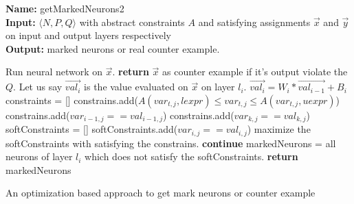 \begin{algorithm}[t]
  \textbf{Name: } getMarkedNeurons2 \\
  \textbf{Input: } $\langle N,P,Q \rangle$ with abstract constraints $A$ and satisfying assignments $\overrightarrow{x}$ and $\overrightarrow{y}$ on input and output layers respectively\\
  \textbf{Output: } marked neurons or real counter example. 
  \begin{algorithmic}[1]
    \State Run neural network on $\overrightarrow{x}$.
    \State \textbf{return} $\overrightarrow{x}$ as counter example if it's output violate the $Q$. 
    \State Let us say $\overrightarrow{val_{i}}$ is the value evaluated on $\overrightarrow{x}$ on layer $l_i$. 
     
        \State $\overrightarrow{val_i} = W_i * \overrightarrow{val_{i-1}} + B_i$ 
      \Else
        \State constraints = []
            \State constrains.add($A(var_{t,j},lexpr) \leq var_{t,j}\leq A(var_{t,j},uexpr)$)
          \EndFor
        \EndFor
          \State constrains.add($var_{i-1,j} == val_{i-1,j}$)
        \EndFor
          \State constrains.add($var_{k,j} == val_{k,j}$)
        \EndFor
        softConstraints = []
          \State softConstraints.add($var_{i,j} == val_{i,j}$)
        \EndFor
        \State maximize the softConstraints with satisfying the constrains. 
          \State \textbf{continue}
        \Else
          \State markedNeurons = all neurons of layer $l_i$ which does not satisfy the softConstraints. 
          \State \textbf{return} markedNeurons
        \EndIf 
      \EndIf
    \EndFor
  \end{algorithmic}
  \caption{An optimization based approach to get mark neurons or counter example}
  \label{algo:refine2}
\end{algorithm}







